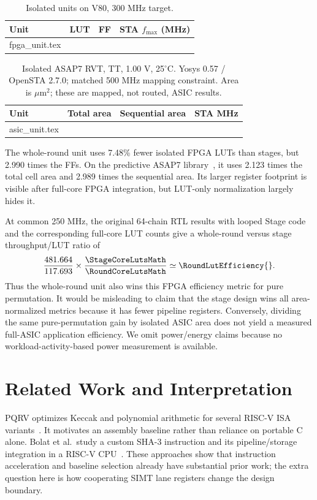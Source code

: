\documentclass[conference,letterpaper]{IEEEtran}
\makeatletter
\newcommand{\tablerows}[1]{\@@input #1 }
\makeatother
\begin{document}
\begin{table}[t]
\caption{Isolated units on V80, 300 MHz target.}
\label{tab:unitfpga}
\centering\footnotesize
\begin{tabular}{@{}lrrr@{}}
\toprule
Unit & LUT & FF & STA $f_{\max}$ (MHz) \\
\midrule
\tablerows{fpga_unit.tex}
\bottomrule
\end{tabular}
\end{table}

\begin{table}[t]
\caption{Isolated ASAP7 RVT, TT, 1.00 V, 25$^\circ$C.
Yosys 0.57 / OpenSTA 2.7.0; matched 500 MHz mapping constraint.
Area is $\mu\mathrm{m}^2$; these are mapped, not routed, ASIC results.}
\label{tab:unitasic}
\centering\footnotesize\setlength{\tabcolsep}{4pt}
\begin{tabular}{@{}lrrr@{}}
\toprule
Unit & Total area & Sequential area & STA MHz \\
\midrule
\tablerows{asic_unit.tex}
\bottomrule
\end{tabular}
\end{table}

The whole-round unit uses 7.48\% fewer isolated FPGA LUTs than stages,
but 2.990 times the FFs. On the predictive ASAP7 library~\cite{asap7},
it uses 2.123 times the total cell area and 2.989 times the sequential
area. Its larger register footprint is visible after full-core FPGA
integration, but LUT-only normalization largely hides it.

At common 250 MHz, the original 64-chain RTL results with looped Stage code
and the corresponding full-core LUT counts give a whole-round versus stage
throughput/LUT ratio of
\begin{equation}
\frac{481.664}{117.693}\times
\frac{\StageCoreLutsMath}{\RoundCoreLutsMath}
\simeq \RoundLutEfficiency{}.
\end{equation}
Thus the whole-round unit also wins this FPGA efficiency metric for pure
permutation. It would be misleading to claim that the stage design wins
all area-normalized metrics because it has fewer pipeline registers.
Conversely, dividing the same pure-permutation gain by isolated ASIC area
does not yield a measured full-ASIC application efficiency.
We omit power/energy claims because no workload-activity-based power
measurement is available.

\section{Related Work and Interpretation}
PQRV optimizes Keccak and polynomial arithmetic for several RISC-V ISA
variants~\cite{pqrv}. It motivates an assembly baseline rather than reliance
on portable C alone. Bolat et al.\ study a custom SHA-3 instruction and
its pipeline/storage integration in a RISC-V CPU~\cite{bolat}.
These approaches show that instruction acceleration and baseline selection
already have substantial prior work; the extra question here is how
cooperating SIMT lane registers change the design boundary.
\end{document}
